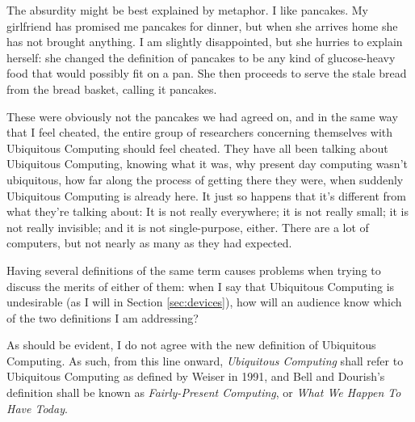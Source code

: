 The absurdity might be best explained by metaphor. I like pancakes. My girlfriend has promised me pancakes for dinner,
but when she arrives home she has not brought anything. I am slightly disappointed, but she hurries to explain
herself: she changed the definition of pancakes to be any kind of glucose-heavy food that would possibly fit on a pan.
She then proceeds to serve the stale bread from the bread basket, calling it pancakes.

These were obviously not the pancakes we had agreed on, and in the same way that I feel cheated, the entire group of researchers concerning
themselves with Ubiquitous Computing should feel cheated. They have all been talking about Ubiquitous Computing, knowing
what it was, why present day computing wasn't ubiquitous, how far along the process of getting there they were, when suddenly
Ubiquitous Computing is already here. It just so happens that it's different from what they're talking about: It is
not really everywhere; it is not really small; it is not really invisible; and it is not single-purpose, either. There are
a lot of computers, but not nearly as many as they had expected.

Having several definitions of the same term causes problems when trying to discuss the merits of either of them: when I say
that Ubiquitous Computing is undesirable (as I will in Section \ref{sec:devices}), how will
an audience know which of the two definitions I am addressing?

As should be evident, I do not agree with the new definition of Ubiquitous Computing. As such, from this line onward,
\emph{Ubiquitous Computing} shall refer to Ubiquitous Computing as defined by Weiser in 1991, and Bell and Dourish's
definition shall be known as \emph{Fairly-Present Computing}, or \emph{What We Happen To Have Today}.